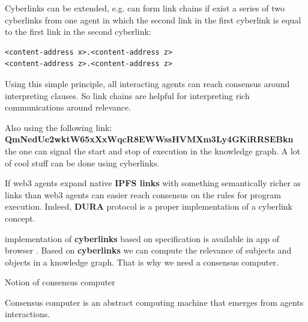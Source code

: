 \documentclass[10pt,oneside]{amsart}
\makeatletter
\def\section{\@startsection{section}{1}%
  \z@{.7\linespacing\@plus\linespacing}{.5\linespacing}%
  {\normalfont\scshape}}%
\newcommand{\code}[1]{\textbf{#1}}
\newenvironment{Figure}
  {\par\medskip\noindent\minipage{\linewidth}}
  {\endminipage\par\medskip}
\newcommand{\linkred}[2]{\href{#1}{\color{red}{#2}}}
\makeatother
\begin{document}
Cyberlinks can be extended, e.g. can form link chains if exist a series of two cyberlinks from one agent in which the second link in the first cyberlink is equal to the first link in the second cyberlink:

\begin{lstlisting}
<content-address x>.<content-address z>
<content-address z>.<content-address z>
\end{lstlisting}

Using this simple principle, all interacting agents can reach consensus around interpreting clauses. So link chains are helpful for interpreting rich communications around relevance.

    
Also using the following link: \code{QmNedUe2wktW65xXxWqcR8EWWssHVMXm3Ly4GKiRRSEBkn} the one can signal the start and stop of execution in the knowledge graph. A lot of cool stuff can be done using cyberlinks.

If web3 agents expand native \code{IPFS links} with something semantically richer as 
\linkred{https://github.com/cybercongress/cyb/blob/dev/docs/dura.md}{DURA}
links than web3 agents can easier reach consensus on the rules for program execution. Indeed, \code{DURA} protocol is a proper implementation of a cyberlink concept.

\linkred{https://github.com/cybercongress/cyberd}{cyber} implementation of \code{cyberlinks} based on \linkred{https://github.com/cybercongress/cyb/blob/dev/docs/dura.md}{DURA} specification is available in \linkred{https://github.com/cybercongress/.cyber}{.cyber} app of browser \linkred{https://github.com/cybercongress/cyb}{cyb}.
Based on \code{cyberlinks} we can compute the relevance of subjects and objects in a knowledge graph. That is why we need a consensus computer.

\section{Notion of consensus computer}\label{notion of consensus computer}

Consensus computer is an abstract computing machine that emerges from agents interactions.
\end{document}
